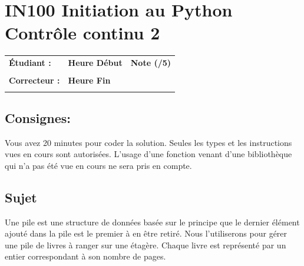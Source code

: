 \documentclass[a4paper,11pt]{article}
\begin{document}
\newtheorem{theo}{Theorem}
\newtheorem{coro}{Corollary}[theo]
\newtheorem{lemme}{Lemma}
\renewcommand{\thecoro}{\thetheo.\arabic{coro}}



\parindent=0cm


\section*{\center IN100 Initiation au Python\\
Contrôle continu 2}

\vspace{1 cm}

\begin{table}[h!]
\centering
\renewcommand{\arraystretch}{1.4} %
\begin{tabular}{|p{10cm}|p{3cm}|p{2cm}|}
\hline
\textbf{Étudiant :} & \textbf{Heure Début }  & \textbf{Note (/5) }  \\
& & \\
\hline
\textbf{Correcteur :} & \textbf{Heure Fin } & \\
& & \\
\hline

\hline
\end{tabular}
\end{table}

\vspace{-0.2 cm}
\subsection*{Consignes:} Vous avez 20 minutes pour coder la solution. Seules les types et les instructions vues en cours sont autorisées. L'usage d'une fonction 
venant d'une bibliothèque qui n'a pas été vue en cours ne sera pris en compte. 

\vspace{-0.2 cm}
\subsection*{Sujet}

Une pile est une structure de données basée sur le principe que le dernier élément ajouté dans la pile est le premier à en être retiré.
Nous l'utiliserons pour gérer une pile de livres à ranger sur une étagère. Chaque livre est représenté par un entier correspondant à son nombre de pages.
\end{document}
